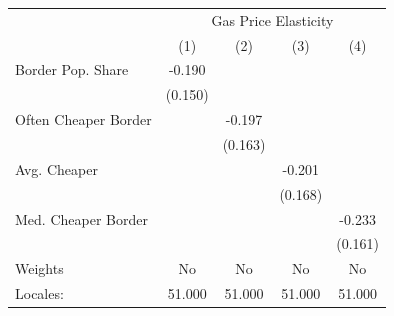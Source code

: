 {
\def\sym#1{\ifmmode^{#1}\else\(^{#1}\)\fi}
\begin{tabular}{l*{4}{c}}
\hline\hline
            &\multicolumn{4}{c}{Gas Price Elasticity}                                               \\
            &\multicolumn{1}{c}{(1)}         &\multicolumn{1}{c}{(2)}         &\multicolumn{1}{c}{(3)}         &\multicolumn{1}{c}{(4)}         \\
\hline
Border Pop. Share&      -0.190         &                     &                     &                     \\
            &     (0.150)         &                     &                     &                     \\
[1em]
Often Cheaper Border&                     &      -0.197         &                     &                     \\
            &                     &     (0.163)         &                     &                     \\
[1em]
Avg. Cheaper&                     &                     &      -0.201         &                     \\
            &                     &                     &     (0.168)         &                     \\
[1em]
Med. Cheaper Border&                     &                     &                     &      -0.233         \\
            &                     &                     &                     &     (0.161)         \\
\hline
Weights     &          No         &          No         &          No         &          No         \\
Locales:    &      51.000         &      51.000         &      51.000         &      51.000         \\
\hline\hline
\end{tabular}
}
